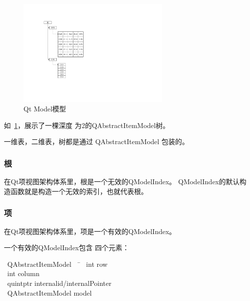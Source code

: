 \begin{figure}[htb] %
\marginnote{\setlength\fboxsep{2pt}\fbox{\footnotesize{\kaishu\figurename\,}\footnotesize{\ref{p000048}}}}\centering %
\includegraphics[width=7.5cm]{chapter10/images/ModelAndIndex.pdf} %
\caption{Qt Model模型} %
\label{p000048} %
\end{figure}


如\figurename\ \ref{p000048}，展示了一棵深度
为2的QAbstractItemModel树。

一维表，二维表，树都是通过
QAbstractItemModel
包装的。

\FloatBarrier
\subsubsection{
根
}\label{c000019s01s03s01}

在Qt项视图架构体系里，根是一个无效的QModelIndex。
QModelIndex的默认构造函数就是构造一个无效的索引，也就代表根。

\FloatBarrier
\subsubsection{
项
}\label{c000019s01s03s02}

在Qt项视图架构体系里，项是一个有效的QModelIndex。

一个有效的QModelIndex包含
四个元素：\begin{tabbing}
\hspace*{\parindent}\textbullet\ QAbstractItemModel \raisebox{-0.35ex}{\sourcefonttwo{}*}  \ \ \= \kill
\hspace*{\parindent}\textbullet\ int                   \> row  \\
\hspace*{\parindent}\textbullet\ int                   \> column  \\
\hspace*{\parindent}\textbullet\ quintptr              \> internalid/internalPointer \\
\hspace*{\parindent}\textbullet\ QAbstractItemModel \raisebox{-0.35ex}{\sourcefonttwo{}*}  \> model
\end{tabbing}

